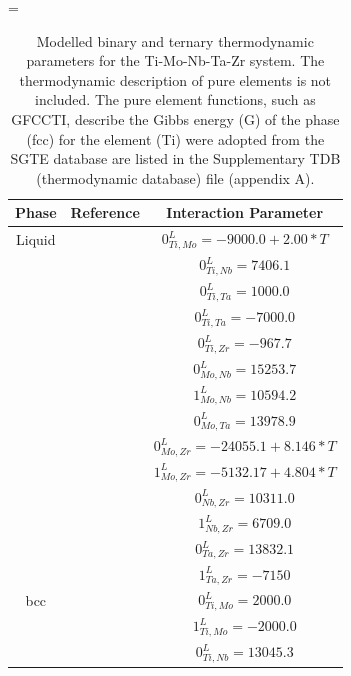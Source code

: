 \newpage
\LTcapwidth=\textwidth
\begin{longtable}[H]{ c c c }
	\caption{Modelled binary and ternary thermodynamic parameters for the Ti-Mo-Nb-Ta-Zr system. The thermodynamic description of pure elements is not included. The pure element functions, such as GFCCTI, describe the Gibbs energy (G) of the phase (fcc) for the element (Ti) were adopted from the SGTE database \cite{Dinsdale1991} are listed in the Supplementary TDB (thermodynamic database) file (appendix A).} \label{Ch3-table:ip}\\
		\hline
		Phase & Reference & Interaction Parameter\\
		\hline
		\endhead
		\hline
		\endfoot
		Liquid & \cite{Ansara1998} & $0^\textit{L}_{Ti,Mo} = -9000.0+2.00*T$\\
		          & \cite{Zhang2001} & $0^\textit{L}_{Ti,Nb} = 7406.1$\\
		          & \cite{Ansara1998} & $0^\textit{L}_{Ti,Ta} = 1000.0$\\
		          & \cite{Ansara1998} & $0^\textit{L}_{Ti,Ta} = -7000.0$\\
		          & \cite{Kumar1994a} & $0^\textit{L}_{Ti,Zr} = -967.7$\\
		          & \cite{Xiong2004} & $0^\textit{L}_{Mo,Nb} = 15253.7$\\
		          & \cite{Xiong2004} & $1^\textit{L}_{Mo,Nb} = 10594.2$\\
		          & \cite{Xiong2004} & $0^\textit{L}_{Mo,Ta} = 13978.9$\\
		          & \cite{Perez2003} & $0^\textit{L}_{Mo,Zr} = -24055.1+8.146*T$\\
		          & \cite{Perez2003} & $1^\textit{L}_{Mo,Zr} = -5132.17+4.804*T$\\
		          & \cite{Guillermet1991} & $0^\textit{L}_{Nb,Zr} = 10311.0$\\
		          & \cite{Guillermet1991} & $1^\textit{L}_{Nb,Zr} = 6709.0$\\
		          & \cite{Guillermet1995} & $0^\textit{L}_{Ta,Zr} = 13832.1$\\
		          & \cite{Guillermet1995} & $1^\textit{L}_{Ta,Zr} = -7150$\\
          bcc & \cite{Ansara1998} & $0^\textit{L}_{Ti,Mo} = 2000.0$\\
                  & \cite{Ansara1998} & $1^\textit{L}_{Ti,Mo} = -2000.0$\\
                  & \cite{Zhang2001} & $0^\textit{L}_{Ti,Nb} = 13045.3$\\

\end{longtable}
